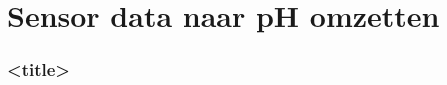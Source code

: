 \section{Sensor data naar pH omzetten}
    \begin{frame}
        \frametitle{<title>}
    
        
    
    \end{frame}